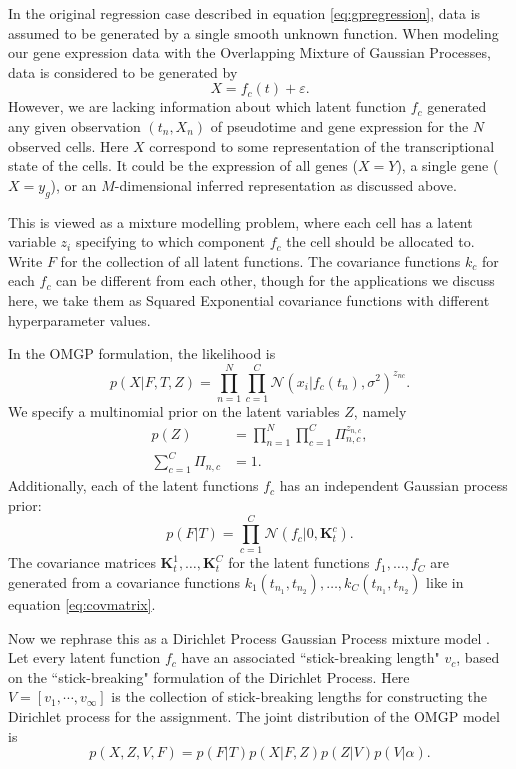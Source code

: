 In the original regression case described in equation \ref{eq:gpregression}, data is assumed to be generated by a single smooth unknown function. When modeling our gene expression data with the Overlapping Mixture of Gaussian Processes, data is considered to be generated by
\[ X = f_c(t) + \varepsilon. \]
However, we are lacking information about which latent function $ f_c $ generated any given observation $ ( t_n, X_n ) $ of pseudotime and gene expression for the $ N $ observed cells. Here $ X $ correspond to some representation of the transcriptional state of the cells. It could be the expression of all genes ($ X = Y $), a single gene ($ X = y_g $), or an $ M $-dimensional inferred representation as discussed above.

This is viewed as a mixture modelling problem, where each cell has a latent variable $ z_i $ specifying to which component $ f_c $ the cell should be allocated to. Write $ F $ for the collection of all latent functions. The covariance functions $ k_c $ for each $ f_c $ can be different from each other, though for the applications we discuss here, we take them as Squared Exponential covariance functions with different hyperparameter values.

In the OMGP formulation, the likelihood is
\[
p(X | F, T, Z) = \prod_{n=1}^N \prod_{c=1}^C \mathcal{N}(x_i | f_c(t_n), \sigma^2)^{z_{nc}}.
\]
We specify a multinomial prior on the latent variables $ Z $, namely
\begin{align*}
p(Z) &= \prod_{n = 1}^N \prod_{c = 1}^C \Pi_{n, c}^{z_{n, c}}, \\
\sum_{c = 1}^C \Pi_{n,c} &= 1.
\end{align*}
Additionally, each of the latent functions $ f_c $ has an independent Gaussian process prior:
\[ p(F | T) = \prod_{c=1}^C \mathcal{N}( f_c | 0, \bm{K}^c_t). \]
The covariance matrices $ \bm{K}^1_t, \ldots, \bm{K}^C_t $ for the latent functions $ f_1, \ldots, f_C $ are generated from a covariance functions $ k_1(t_{n_1}, t_{n_2}), \ldots, k_C(t_{n_1}, t_{n_2}) $ like in equation \ref{eq:covmatrix}.

Now we rephrase this as a Dirichlet Process Gaussian Process mixture model \cite{Hensman2012-kr}. Let every latent function $ f_c $ have an associated ``stick-breaking length" $ v_c $, based on the ``stick-breaking" formulation of the Dirichlet Process. Here $ V = [v_1, \cdots, v_\infty] $ is the collection of stick-breaking lengths for constructing the Dirichlet process for the assignment. The joint distribution of the OMGP model is
\[
p(X, Z, V, F) = p(F | T) p(X | F, Z) p(Z | V ) p(V | \alpha).
\]


